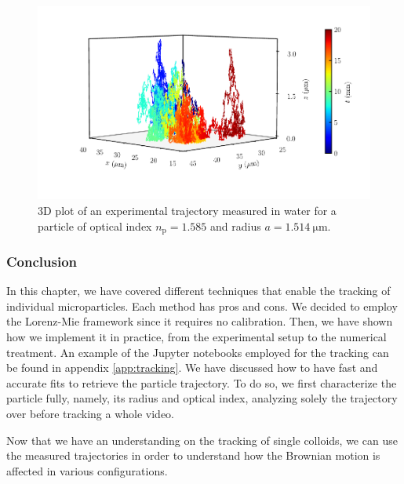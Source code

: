 \begin{figure}[H]
	\centering
	\includegraphics{02_body/chapter2/images/trajectory/traj.pdf}
	\caption{3D plot of an experimental trajectory measured in water for a particle of optical index $n_\mathrm{p} = 1.585$ and radius $a = 1.514  ~ \mathrm{\mu m}$.~\href{https://github.com/eXpensia/Confined-Brownian-Motion/blob/main/02_body/chapter2/images/trajectory/graph_ploting.ipynb}{\faGithub}}
	\label{fig:3dtrajec}
\end{figure}

\subsubsection{Conclusion}

In this chapter, we have covered different techniques that enable the tracking of individual microparticles. Each method has pros and cons. We decided to employ the Lorenz-Mie framework since it requires no calibration. Then, we have shown how we implement it in practice, from the experimental setup to the numerical treatment. An example of the Jupyter notebooks employed for the tracking can be found in appendix \ref{app:tracking}.  We have discussed how to have fast and accurate fits to retrieve the particle trajectory. To do so, we first characterize the particle fully, namely, its radius and optical index, analyzing solely the trajectory over before tracking a whole video. 

Now that we have an understanding on the tracking of single colloids, we can use the measured trajectories in order to understand how the Brownian motion is affected in various configurations. 

